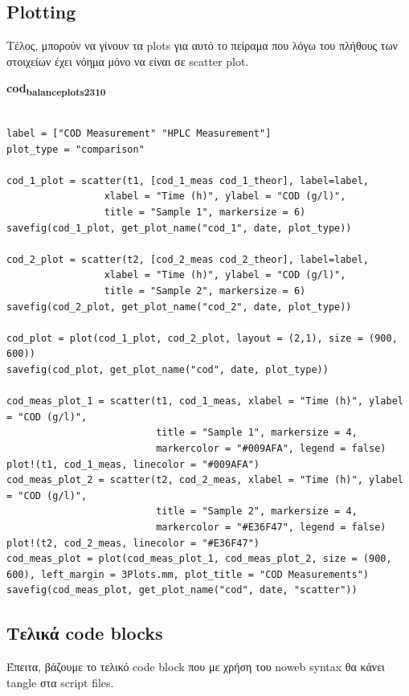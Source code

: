\documentclass[11pt]{article}
\begin{document}
\subsection{Plotting}
\label{sec:org3f7470a}
Τέλος, μπορούν να γίνουν τα plots για αυτό το πείραμα που λόγω του πλήθους των στοιχείων έχει νόημα μόνο να είναι σε scatter plot.

\textbf{cod\textsubscript{balance}\textsubscript{plots}\textsubscript{23}\textsubscript{10}}
\begin{verbatim}

label = ["COD Measurement" "HPLC Measurement"]
plot_type = "comparison"

cod_1_plot = scatter(t1, [cod_1_meas cod_1_theor], label=label,
                 xlabel = "Time (h)", ylabel = "COD (g/l)",
                 title = "Sample 1", markersize = 6)
savefig(cod_1_plot, get_plot_name("cod_1", date, plot_type))

cod_2_plot = scatter(t2, [cod_2_meas cod_2_theor], label=label,
                 xlabel = "Time (h)", ylabel = "COD (g/l)",
                 title = "Sample 2", markersize = 6)
savefig(cod_2_plot, get_plot_name("cod_2", date, plot_type))

cod_plot = plot(cod_1_plot, cod_2_plot, layout = (2,1), size = (900, 600))
savefig(cod_plot, get_plot_name("cod", date, plot_type))

cod_meas_plot_1 = scatter(t1, cod_1_meas, xlabel = "Time (h)", ylabel = "COD (g/l)",
                          title = "Sample 1", markersize = 4,
                          markercolor = "#009AFA", legend = false)
plot!(t1, cod_1_meas, linecolor = "#009AFA")
cod_meas_plot_2 = scatter(t2, cod_2_meas, xlabel = "Time (h)", ylabel = "COD (g/l)",
                          title = "Sample 2", markersize = 4,
                          markercolor = "#E36F47", legend = false)
plot!(t2, cod_2_meas, linecolor = "#E36F47")
cod_meas_plot = plot(cod_meas_plot_1, cod_meas_plot_2, size = (900, 600), left_margin = 3Plots.mm, plot_title = "COD Measurements")
savefig(cod_meas_plot, get_plot_name("cod", date, "scatter"))
\end{verbatim}

\subsection{Τελικά code blocks}
\label{sec:org6db5a80}
Έπειτα, βάζουμε το τελικό code block που με χρήση του noweb syntax θα κάνει tangle στα script files.
\end{document}
